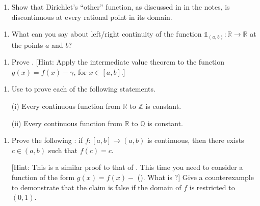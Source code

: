 \documentclass[letterpaper,10pt,english]{jupyterBook}
\begin{document}
\label{\detokenize{Problems:id22}}\begin{enumerate}
%
\setcounter{enumi}{21}
\item {} 
\sphinxAtStartPar
{} Show that Dirichlet’s “other” function, as discussed in  in the notes, is discontinuous at every rational point in its domain.

\end{enumerate}
\label{\detokenize{Problems:id23}}\begin{enumerate}
%
\setcounter{enumi}{22}
\item {} 
\sphinxAtStartPar
What can you say about left/right continuity of the function  \(\mathbb{1}_{(a, b)}:\mathbb{R}\to\mathbb{R}\) at the points \(a\) and \(b\)?

\end{enumerate}
\label{\detokenize{Problems:id24}}\begin{enumerate}
%
\setcounter{enumi}{23}
\item {} 
\sphinxAtStartPar
Prove . {[}Hint: Apply the intermediate value theorem to the function \(g(x) = f(x) - \gamma\), for \(x \in [a, b]\).{]}

\end{enumerate}
\label{\detokenize{Problems:id25}}\begin{enumerate}
%
\setcounter{enumi}{24}
\item {} 
\sphinxAtStartPar
Use  to prove each of the following statements.

\sphinxAtStartPar
(i) Every continuous function from \(\mathbb{R}\) to \(\mathbb{Z}\) is constant.

\sphinxAtStartPar
(ii) Every continuous function from \(\mathbb{R}\) to \(\mathbb{Q}\) is constant.

\end{enumerate}
\label{\detokenize{Problems:id26}}\begin{enumerate}
%
\setcounter{enumi}{25}
\item {} 
\sphinxAtStartPar
Prove the following : if \(f:[a,b] \rightarrow (a,b)\) is continuous, then there exists \(c \in (a, b)\) such that \(f(c) = c\).

{[}Hint: This is a similar proof to that of {\hyperref[\detokenize{Problems:id24}]{}}. This time you need to consider a function of the form \(g(x) = f(x) - \) (). What is ?{]} Give a counter\sphinxhyphen{}example to demonstrate that the claim is false if the domain of \(f\) is restricted to \((0, 1)\).

\end{enumerate}
\end{document}
